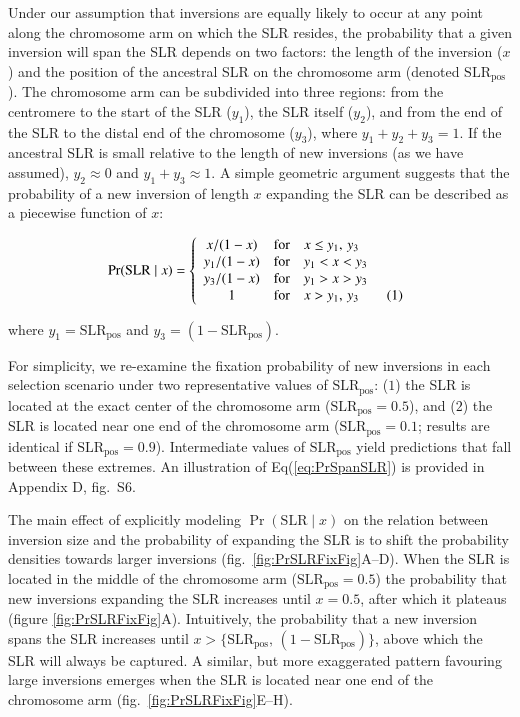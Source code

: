 \documentclass{article}[12pt]
\newcommand\numberthis{\addtocounter{equation}{1}\tag{\theequation}}
\begin{document}
Under our assumption that inversions are equally likely to occur at any point along the chromosome arm on which the SLR resides, the probability that a given inversion will span the SLR depends on two factors: the length of the inversion ($x$) and the position of the ancestral SLR on the chromosome arm (denoted $\text{SLR}_{\text{pos}}$). The chromosome arm can be subdivided into three regions: from the centromere to the start of the SLR ($y_1$), the SLR itself ($y_2$), and from the end of the SLR to the distal end of the chromosome ($y_3$), where $y_1 + y_2 + y_3 = 1$. If the ancestral SLR is small relative to the length of new inversions (as we have assumed), $y_2 \approx 0$ and $y_1 + y_3 \approx 1$. A simple geometric argument suggests that the probability of a new inversion of length $x$ expanding the SLR can be described as a piecewise function of $x$:
\begin{linenomath*}
\begin{equation}\label{eq:PrSpanSLR}
	\Pr(\text{SLR} \mid x) = \left\{ 
		\begin{array}{ccl} 
			x  /(1 - x) & \mbox{for} & x \leq y_1,\,y_3 \\
			y_1/(1 - x) & \mbox{for} & y_1 < x < y_3 \\ 
			y_3/(1 - x) & \mbox{for} & y_1 > x > y_3 \\ 
			1 & \mbox{for} & x > y_1,\,y_3 \numberthis			
		\end{array}\right.
\end{equation}
\end{linenomath*}

\noindent where $y_1 = \text{SLR}_{\text{pos}}$ and $y_3 = (1 - \text{SLR}_{\text{pos}})$. 

For simplicity, we re-examine the fixation probability of new inversions in each selection scenario under two representative values of $\text{SLR}_{\text{pos}}$: ($1$) the SLR is located at the exact center of the chromosome arm ($\text{SLR}_{\text{pos}} = 0.5$), and ($2$) the SLR is located near one end of the chromosome arm ($\text{SLR}_{\text{pos}} = 0.1$; results are identical if $\text{SLR}_{\text{pos}} = 0.9$). Intermediate values of $\text{SLR}_{\text{pos}}$ yield predictions that fall between these extremes. An illustration of Eq(\ref{eq:PrSpanSLR}) is provided in Appendix D, fig.~S6.  

The main effect of explicitly modeling $\Pr(\text{SLR} \mid x)$ on the relation between inversion size and the probability of expanding the SLR is to shift the probability densities towards larger inversions (fig.~\ref{fig:PrSLRFixFig}A--D). When the SLR is located in the middle of the chromosome arm ($\text{SLR}_{\text{pos}} = 0.5$) the probability that new inversions expanding the SLR increases until $x = 0.5$, after which it plateaus (figure \ref{fig:PrSLRFixFig}A). Intuitively, the probability that a new inversion spans the SLR increases until $x > \{\text{SLR}_{\text{pos}},\,(1 - \text{SLR}_{\text{pos}})\}$, above which the SLR will always be captured. A similar, but more exaggerated pattern favouring large inversions emerges when the SLR is located near one end of the chromosome arm (fig.~\ref{fig:PrSLRFixFig}E--H).
\end{document}
